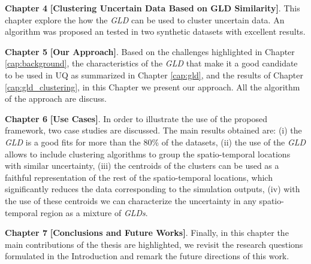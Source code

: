 \textbf{Chapter 4} \textbf{[Clustering Uncertain Data Based on GLD Similarity]}. This chapter explore the how the \textit{GLD} can be used to cluster uncertain data. An algorithm was proposed an tested in two synthetic datasets with excellent results. 

\textbf{Chapter 5} \textbf{[Our Approach]}. Based on the challenges highlighted in Chapter \ref{cap:background}, the characteristics of the \textit{GLD} that make it a good candidate to be used in UQ as summarized in Chapter \ref{cap:gld}, and the results of Chapter \ref{cap:gld_clustering}, in this Chapter we present our approach. All the algorithm of the approach are discuss. 

\textbf{Chapter 6} \textbf{[Use Cases]}. In order to illustrate the use of the proposed framework, two case studies are discussed. The main results obtained are: (i) the \textit{GLD} is a good fits for more than the 80\% of the datasets, (ii) the use of the \textit{GLD} allows to include clustering algorithms to group the spatio-temporal locations with similar uncertainty, (iii) the centroids  of the clusters can be used as a faithful representation of the rest of the spatio-temporal locations, which significantly reduces the data corresponding to the simulation outputs, (iv) with the use of these centroids we can characterize the uncertainty in any spatio-temporal region as a mixture of \textit{GLDs}.

\textbf{Chapter 7} \textbf{[Conclusions and Future Works]}. Finally, in this chapter the main contributions of the thesis are highlighted, we revisit the research questions formulated in the Introduction and remark the future directions of this work.
